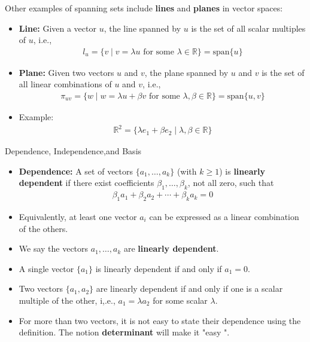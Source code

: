 \begin{frame}{}
Other examples of spanning sets include \textbf{lines} and \textbf{planes} in vector spaces:
\begin{itemize}
    \item \textbf{Line:} Given a vector $u$, the line spanned by $u$ is the set of all scalar multiples of $u$, i.e.,
    \begin{align*}
        l_u = \{ v \mid v = \lambda u \text{ for some } \lambda \in \mathbb{R} \} = \text{span}\{ u \}
    \end{align*}
    \item \textbf{Plane:} Given two vectors $u$ and $v $, the plane spanned by $u$ and $v$ is the set of all linear combinations of $u$ and $v$, i.e.,
    \begin{align*}
        \pi_{uv} = \{ w \mid w = \lambda u + \beta v \text{ for some } \lambda, \beta \in \mathbb{R} \} = \text{span}\{ u, v \}
    \end{align*}
    \item Example:
\begin{align*}
    \mathbb{R}^2 = \{\lambda e_1 + \beta    e_2 \mid \lambda, \beta\in \mathbb{R} \}
\end{align*}
\end{itemize}
\end{frame}



\begin{frame}{ Dependence, Independence,and Basis}
\begin{itemize}
    \item \textbf{Dependence: }A set of vectors $\{a_1, \ldots, a_k\}$ (with $k \geq 1$) is \textbf{linearly dependent} if there exist coefficients $\beta_1, \ldots, \beta_k$, not all zero, such that
    \begin{align}
        \beta_1 a_1 + \beta_2 a_2 + \cdots + \beta_k a_k = 0
    \end{align}
    \item Equivalently, at least one vector $a_i$ can be expressed as a linear combination of the others.
    \item We say the vectors $a_1, \ldots, a_k$ are \textbf{linearly dependent}.
\end{itemize}
\end{frame}

\begin{frame}
    \begin{itemize}
        \item A single vector $\{a_1\}$ is linearly dependent if and only if $a_1 = 0$.
    \item Two vectors $\{a_1, a_2\}$ are linearly dependent if and only if one is a scalar multiple of the other, i,.e., $a_1 = \lambda a_2$ for some scalar $\lambda$.
    \item For more than two vectors, it is not easy to state their dependence using the definition. The notion \textbf{determinant} will make it "easy ".
    \end{itemize}
\end{frame}

